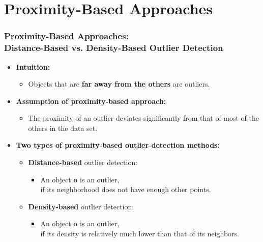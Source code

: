 \section{Proximity-Based Approaches}


\begin{frame}
	\frametitle{Proximity-Based Approaches: \\
		Distance-Based vs. Density-Based Outlier Detection}
	\begin{itemize}
		\item \textbf{Intuition:}
		      \begin{itemize}
			      \item Objects that are \textbf{far away from the others} are outliers.
		      \end{itemize}
		\item \textbf{Assumption of proximity-based approach:}
		      \begin{itemize}
			      \item The proximity of an outlier deviates significantly from that of most of the others in the data set.
		      \end{itemize}
		\item \textbf{Two types of proximity-based outlier-detection methods:}
		      \begin{itemize}
			      \item \textbf{\color{airforceblue}Distance-based} outlier detection:
			            \begin{itemize}
				            \item An object $\mathbf{o}$ is an outlier, \\
				                  if its neighborhood does not have enough other points.
			            \end{itemize}
			      \item \textbf{\color{airforceblue}Density-based} outlier detection:
			            \begin{itemize}
				            \item An object $\mathbf{o}$ is an outlier, \\
				                  if its density is relatively much lower than that of its neighbors.
			            \end{itemize}
		      \end{itemize}
	\end{itemize}
\end{frame}


